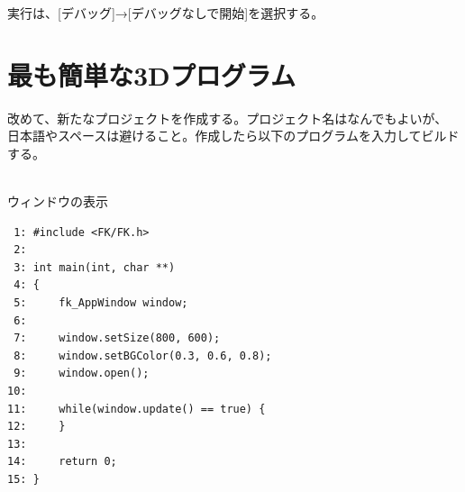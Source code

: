 実行は、[デバッグ]→[デバッグなしで開始]を選択する。
\section{最も簡単な3Dプログラム} \label{sec:01-start3d}
改めて、新たなプロジェクトを作成する。プロジェクト名はなんでもよいが、
日本語やスペースは避けること。作成したら以下のプログラムを入力してビルドする。\\
~
\begin{itembox}[l]{ウィンドウの表示}
\begin{verbatim}
 1: #include <FK/FK.h>
 2: 
 3: int main(int, char **)
 4: {
 5:     fk_AppWindow window;
 6: 
 7:     window.setSize(800, 600);
 8:     window.setBGColor(0.3, 0.6, 0.8);
 9:     window.open();
10: 
11:     while(window.update() == true) {
12:     }
13: 
14:     return 0;
15: }
\end{verbatim}
\end{itembox}
